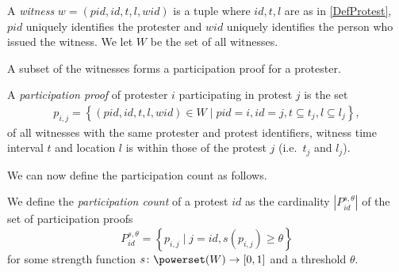 \begin{frame}
\begin{definition}[Witness]
  A \emph{witness} \(w = (pid, id, t, l, wid)\) is a tuple where
  \(id, t, l\) are as in \cref{DefProtest},
  \(pid\) uniquely identifies the protester and \(wid\) uniquely identifies the 
  person who issued the witness.
  We let \(W\) be the set of all witnesses.
\end{definition}
\end{frame}

A subset of the witnesses forms a participation proof for a protester.

\begin{frame}
\begin{definition}
  A \emph{participation proof} of protester \(i\) participating in protest \(j\) 
  is the set
  \begin{align}
    \nonumber
    p_{i, j} =
    \left\{ (pid, id, t, l, wid)\in W \mid
    pid = i, id = j,
    t \subseteq t_j, l\subseteq l_j \right\},
  \end{align}
  of all witnesses with the same protester and protest identifiers, witness time 
  interval \(t\) and location \(l\) is within those of the protest \(j\) (i.e.\ 
  \(t_j\) and \(l_j\)).
\end{definition}
\end{frame}

We can now define the participation count as follows.
\begin{definition}
  We define the \emph{participation count} of a protest \(id\) as the 
  cardinality \(|P_{id}^{s,\theta}|\) of the set of participation proofs \[
    P_{id}^{s,\theta} = \left\{ p_{i,j} \mid
      j = id, s(p_{i,j})\geq \theta \right\}
  \] for some strength function \(s\colon \powerset(W)\to \interval{0}{1}\) and 
  a threshold \(\theta\).
\end{definition}

